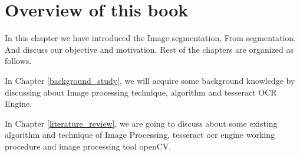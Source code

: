 \section{Overview of this book}
In this chapter we have introduced the Image segmentation, From segmentation. And discuss our objective and motivation. Rest of the chapters are organized as follows.

In Chapter \ref{background_study}, we will acquire some background knowledge by discussing about Image processing technique, algorithm and tesseract OCR Engine.

In Chapter \ref{literature_review}, we are going to discuss about some existing algorithm and technique of Image Processing, tesseract ocr engine working procedure and image processing tool openCV.


